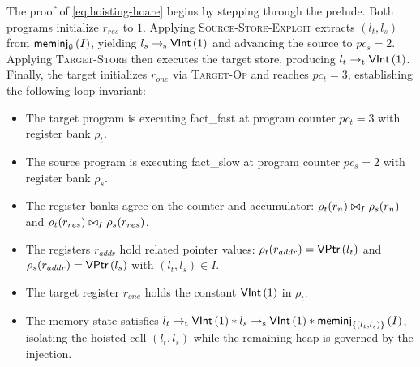\documentclass[report.tex]{subfiles}
\begin{document}
The proof of \cref{eq:hoisting-hoare} begins by stepping through the prelude.
Both programs initialize $r_{res}$ to $1$.
Applying \textsc{Source-Store-Exploit} extracts $(l_t, l_s)$ from
$\meminj{I}{\emptyset}$,
yielding $\ptrs{l_s}{\VInt{1}}$ and advancing the source to $pc_s = 2$.
Applying \textsc{Target-Store} then executes the target store,
producing $\ptrt{l_t}{\VInt{1}}$.
Finally,
the target initializes $r_{one}$ via \textsc{Target-Op}
and reaches $pc_t = 3$,
establishing the following loop invariant:
\begin{itemize}
  \item The target program is executing \textsf{fact\_fast}
        at program counter $pc_t = 3$ with register bank $\rho_t$.
  \item The source program is executing \textsf{fact\_slow}
        at program counter $pc_s = 2$ with register bank $\rho_s$.
  \item The register banks agree on the counter and accumulator:
        $\sameval{I}{\rho_t(r_n)}{\rho_s(r_n)}$
        and $\sameval{I}{\rho_t(r_{res})}{\rho_s(r_{res})}$.
  \item The registers $r_{addr}$ hold related pointer values:
        $\rho_t(r_{addr}) = \VPtr{l_t}$
        and $\rho_s(r_{addr}) = \VPtr{l_s}$
        with $(l_t, l_s) \in I$.
  \item The target register $r_{one}$ holds the constant $\VInt{1}$
        in $\rho_t$.
  \item The memory state satisfies
        $\ptrt{l_t}{\VInt{1}} \sep \ptrs{l_s}{\VInt{1}} \sep
        \meminj{I}{\{ (l_t, l_s) \}}$,
        isolating the hoisted cell $(l_t, l_s)$
        while the remaining heap is governed by the injection.
\end{itemize}
\end{document}
